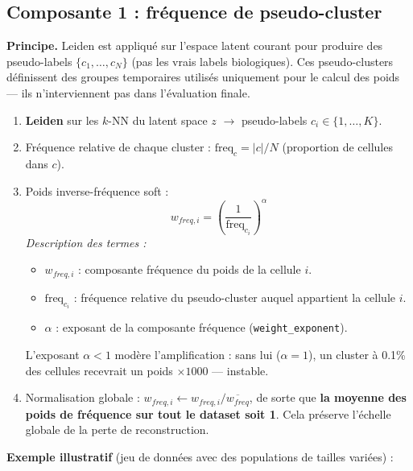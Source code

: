 \documentclass[11pt,a4paper]{article}
\begin{document}
\subsection{Composante 1 : fr\'equence de pseudo-cluster}

\textbf{Principe.} Leiden est appliqu\'e sur l'espace latent courant pour produire des pseudo-labels $\{c_1, \ldots, c_N\}$ (pas les vrais labels biologiques). Ces pseudo-clusters d\'efinissent des groupes temporaires utilis\'es uniquement pour le calcul des poids --- ils n'interviennent pas dans l'\'evaluation finale.

\begin{enumerate}[nosep]
  \item \textbf{Leiden} sur les $k$-NN du latent space $z$ $\to$ pseudo-labels $c_i \in \{1,\ldots,K\}$.
  \item Fr\'equence relative de chaque cluster : $\text{freq}_c = |c| / N$ (proportion de cellules dans $c$).
  \item Poids inverse-fr\'equence soft :
  \[
    w_{freq,i} = \left(\frac{1}{\mathrm{freq}_{c_i}}\right)^{\alpha}
  \]
  \textit{Description des termes :}
  \begin{itemize}[nosep]
    \item $w_{freq,i}$ : composante fr\'equence du poids de la cellule $i$.
    \item $\mathrm{freq}_{c_i}$ : fr\'equence relative du pseudo-cluster auquel appartient la cellule $i$.
    \item $\alpha$ : exposant de la composante fr\'equence (\texttt{weight\_exponent}).
  \end{itemize}
  L'exposant $\alpha < 1$ mod\`ere l'amplification : sans lui ($\alpha=1$), un cluster \`a 0.1\% des cellules recevrait un poids $\times 1000$ --- instable.
  \item Normalisation globale : $w_{freq,i} \leftarrow w_{freq,i} / \overline{w_{freq}}$, de sorte que \textbf{la moyenne des poids de fr\'equence sur tout le dataset soit 1}. Cela pr\'eserve l'\'echelle globale de la perte de reconstruction.
\end{enumerate}

\textbf{Exemple illustratif} (jeu de donn\'ees avec des populations de tailles vari\'ees) :
\end{document}
